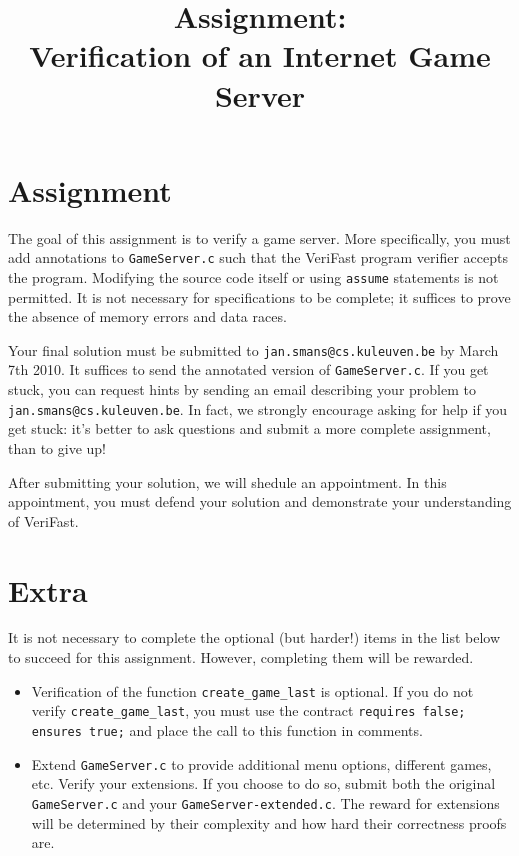 \documentclass{article}
\title{Assignment:\\
Verification of an Internet Game Server}
\begin{document}
\maketitle

\section{Assignment}
The goal of this assignment is to verify a game server. More specifically, you must add annotations to \texttt{GameServer.c} such that the VeriFast program verifier accepts the program. Modifying the source code itself or using \texttt{assume} statements is not permitted. It is not necessary for specifications to be complete; it suffices to prove the absence of memory errors and data races.

Your final solution must be submitted to \texttt{jan.smans@cs.kuleuven.be} by March 7th 2010. It suffices to send the annotated version of \texttt{GameServer.c}. If you get stuck, you can request hints by sending an email describing your problem to \texttt{jan.smans@cs.kuleuven.be}. In fact, we strongly encourage asking for help if you get stuck: it's better to ask questions and submit a more complete assignment, than to give up!

After submitting your solution, we will shedule an appointment. In this appointment, you must defend your solution and demonstrate your understanding of VeriFast.

\section{Extra}
It is not necessary to complete the optional (but harder!) items in the list below to succeed for this assignment. However, completing them will be rewarded.

\begin{itemize}
  \item Verification of the function \texttt{create\_game\_last} is optional. If you do not verify \texttt{create\_game\_last}, you must use the contract \texttt{requires false; ensures true;} and place the call to this function in comments.
  \item Extend \texttt{GameServer.c} to provide additional menu options, different games, etc. Verify your extensions. If you choose to do so, submit both the original \texttt{GameServer.c} and your \texttt{GameServer-extended.c}. The reward for extensions will be determined by their complexity and how hard their correctness proofs are.
\end{itemize}
\end{document}
